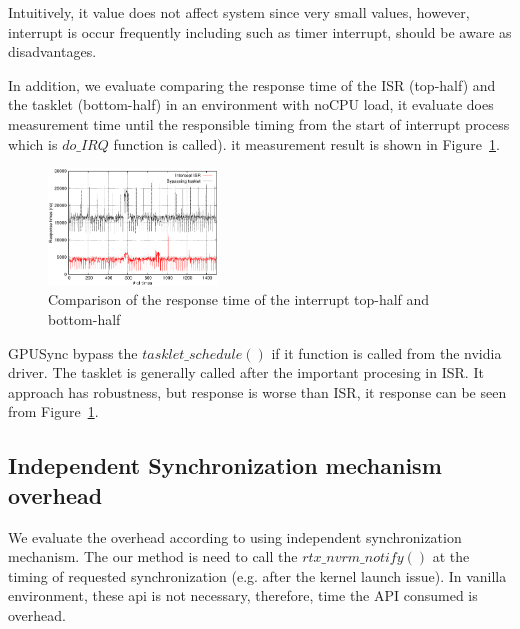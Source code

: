 Intuitively, it value does not affect system since very small values,
however, interrupt is occur frequently including such as timer interrupt, should be aware as disadvantages.

In addition, we evaluate comparing the response time of the ISR (top-half) and the tasklet (bottom-half) in an environment with noCPU load,
it evaluate does measurement time until the responsible timing from the start of interrupt process which is $do\_IRQ$ function is called).
it measurement result is shown in Figure~\ref{fig:bottomvstasklet}.

\begin{figure}[t]
\begin{center}
\includegraphics[width=0.4\textwidth]{img/tasklet_vs_interrupt}
\caption{Comparison of the response time of the interrupt top-half and bottom-half}
\end{center}
\label{fig:bottomvstasklet}
\end{figure}

GPUSync bypass the $tasklet\_schedule()$ if it function is called from the nvidia driver.
The tasklet is generally called after the important procesing in ISR.
It approach has robustness, but response is worse than ISR, it response can be seen from Figure~\ref{fig:bottomvstasklet}.



\subsection{Independent Synchronization mechanism overhead}
We evaluate the overhead according to using independent synchronization mechanism.
The our method is need to call the $rtx\_nvrm\_notify()$ at the timing of requested synchronization (e.g. after the kernel launch issue). 
In vanilla environment, these api is not necessary, therefore, time the API consumed is overhead.

